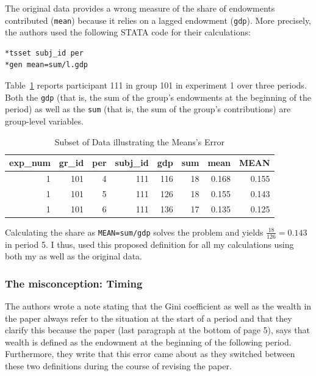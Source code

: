 \documentclass[
  authoryear,
  review,
  3p,
  onecolumn]{elsarticle}
\begin{document}
The original data provides a wrong measure of the share of endowments
contributed (\texttt{mean}) because it relies on a lagged endowment
(\texttt{gdp}). More precisely, the authors used the following STATA
code for their calculations:

\begin{verbatim}
*tsset subj_id per
*gen mean=sum/l.gdp
\end{verbatim}

Table~\ref{tbl-mean-error} reports participant 111 in group 101 in
experiment 1 over three periods. Both the \texttt{gdp} (that is, the sum
of the group's endowments at the beginning of the period) as well as the
\texttt{sum} (that is, the sum of the group's contributions) are
group-level variables.

\hypertarget{tbl-mean-error}{}
\begin{table}
\caption{\label{tbl-mean-error}Subset of Data illustrating the Means's Error }\tabularnewline

\centering
\begin{tabular}{r|r|r|r|r|r|r|r}
\hline
exp\_num & gr\_id & per & subj\_id & gdp & sum & mean & MEAN\\
\hline
1 & 101 & 4 & 111 & 116 & 18 & 0.168 & 0.155\\
\hline
1 & 101 & 5 & 111 & 126 & 18 & 0.155 & 0.143\\
\hline
1 & 101 & 6 & 111 & 136 & 17 & 0.135 & 0.125\\
\hline
\end{tabular}
\end{table}

Calculating the share as \texttt{MEAN=sum/gdp} solves the problem and
yields \(\frac{18}{126}=0.143\) in period 5. I thus, used this proposed
definition for all my calculations using both my as well as the original
data.

\hypertarget{the-misconception-timing}{%
\subsubsection{The misconception:
Timing}\label{the-misconception-timing}}

The authors wrote a note stating that the Gini coefficient as well as
the wealth in the paper always refer to the situation at the start of a
period and that they clarify this because the paper (last paragraph at
the bottom of page 5), says that wealth is defined as the endowment at
the beginning of the following period. Furthermore, they write that this
error came about as they switched between these two definitions during
the course of revising the paper.
\end{document}
